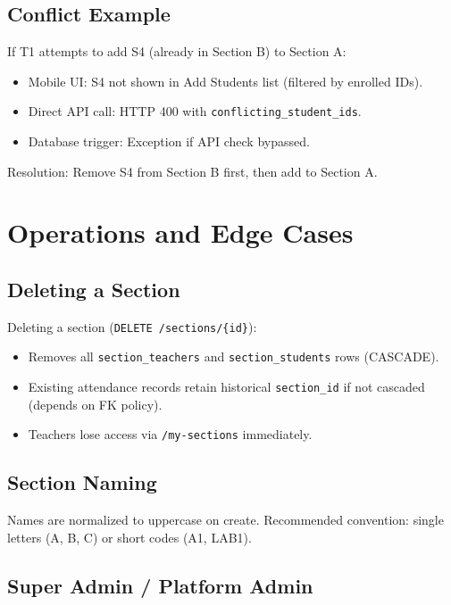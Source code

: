 \documentclass[11pt,a4paper,oneside]{report}
\begin{document}
\section{Conflict Example}

If T1 attempts to add S4 (already in Section B) to Section A:
\begin{itemize}[leftmargin=1.5em]
  \item Mobile UI: S4 not shown in Add Students list (filtered by enrolled IDs).
  \item Direct API call: HTTP 400 with \texttt{conflicting\_student\_ids}.
  \item Database trigger: Exception if API check bypassed.
\end{itemize}

Resolution: Remove S4 from Section B first, then add to Section A.

\chapter{Operations and Edge Cases}
\label{ch:ops}

\section{Deleting a Section}

Deleting a section (\texttt{DELETE /sections/\{id\}}):
\begin{itemize}[leftmargin=1.5em]
  \item Removes all \texttt{section\_teachers} and \texttt{section\_students} rows (CASCADE).
  \item Existing attendance records retain historical \texttt{section\_id} if not cascaded (depends on FK policy).
  \item Teachers lose access via \texttt{/my-sections} immediately.
\end{itemize}

\section{Section Naming}

Names are normalized to uppercase on create. Recommended convention: single letters (A, B, C) or short codes (A1, LAB1).

\section{Super Admin / Platform Admin}
\end{document}
